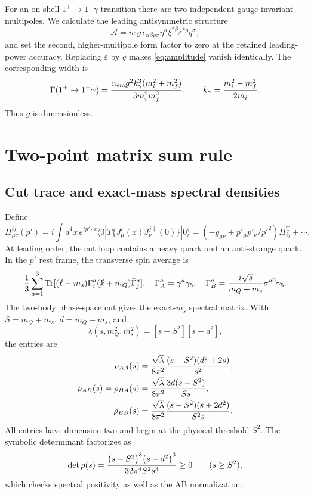 \documentclass[11pt,a4paper]{article}
\newcommand{\PiT}{\Pi^{\mathrm T}}
\newcommand{\tr}{\operatorname{Tr}}
\begin{document}
For an on-shell $1^+\to1^-\gamma$ transition there are two independent
gauge-invariant multipoles.  We calculate the leading antisymmetric
structure
\begin{equation}
\mathcal A=ie\,g\,\epsilon_{\alpha\beta\rho\sigma}
\eta^\alpha\xi^{*\beta}\varepsilon^{*\rho}q^\sigma ,
\label{eq:amplitude}
\end{equation}
and set the second, higher-multipole form factor to zero at the retained
leading-power accuracy.  Replacing $\varepsilon$ by $q$ makes
\cref{eq:amplitude} vanish identically.  The corresponding width is
\begin{equation}
\Gamma(1^+\to1^-\gamma)=
{\alpha_{\rm em}g^2 k_\gamma^3(m_i^2+m_f^2)\over
3m_i^2m_f^2},\qquad
k_\gamma={m_i^2-m_f^2\over2m_i}.
\label{eq:width}
\end{equation}
Thus $g$ is dimensionless.

\section{Two-point matrix sum rule}

\subsection{Cut trace and exact-mass spectral densities}

Define
\begin{equation}
\Pi^{ij}_{\mu\nu}(p')=i\int d^4x\,e^{ip'\cdot x}
\langle0|T\{J^i_\mu(x)J^{j\dagger}_\nu(0)\}|0\rangle
=(-g_{\mu\nu}+p'_\mu p'_\nu/p'^2)\PiT_{ij}+\cdots .
\end{equation}
At leading order, the cut loop contains a heavy quark and an anti-strange
quark.  In the $p'$ rest frame, the transverse spin average is
\begin{equation}
{1\over3}\sum_{a=1}^3
\tr[(\slashed\ell-m_s)\Gamma_i^a(\slashed k+m_Q)
\bar\Gamma_j^a],
\quad
\Gamma_A^a=\gamma^a\gamma_5,\quad
\Gamma_B^a={i\sqrt{s}\over m_Q+m_s}\sigma^{a0}\gamma_5 .
\end{equation}
The two-body phase-space cut gives the exact-$m_s$ spectral matrix.  With
$S=m_Q+m_s$, $d=m_Q-m_s$, and
\begin{equation}
\lambda(s,m_Q^2,m_s^2)=[s-S^2][s-d^2],
\end{equation}
the entries are
\begin{align}
\rho_{AA}(s)&={\sqrt{\lambda}\over8\pi^2}
{(s-S^2)(d^2+2s)\over s^2},\label{eq:rhoaa}\\
\rho_{AB}(s)=\rho_{BA}(s)&={\sqrt{\lambda}\over8\pi^2}
{3d(s-S^2)\over Ss},\label{eq:rhoab}\\
\rho_{BB}(s)&={\sqrt{\lambda}\over8\pi^2}
{(s-S^2)(s+2d^2)\over S^2s}.\label{eq:rhobb}
\end{align}
All entries have dimension two and begin at the physical threshold $S^2$.
The symbolic determinant factorizes as
\begin{equation}
\det\rho(s)={\bigl(s-S^2\bigr)^3\bigl(s-d^2\bigr)^3
\over32\pi^4 S^2s^3}\ge0\qquad(s\ge S^2),
\label{eq:det}
\end{equation}
which checks spectral positivity as well as the AB normalization.
\end{document}
